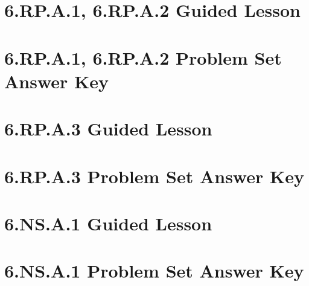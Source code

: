 \documentclass[a4paper,12pt]{article}
\title{}
\date{}
\begin{document}

\hypertarget{toc}{}  %

\tableofcontents
\newpage

\pagestyle{fancy}  %

\newpage
\section{6.RP.A.1, 6.RP.A.2 Guided Lesson}


\newpage
\section{6.RP.A.1, 6.RP.A.2 Problem Set Answer Key}


\newpage
\section{6.RP.A.3 Guided Lesson}


\newpage
\section{6.RP.A.3 Problem Set Answer Key}


\newpage
\section{6.NS.A.1 Guided Lesson}


\newpage
\section{6.NS.A.1 Problem Set Answer Key}

\end{document}

